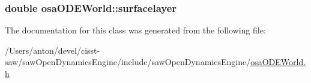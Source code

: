 \subsubsection[{surfacelayer}]{\setlength{\rightskip}{0pt plus 5cm}double osa\+O\+D\+E\+World\+::surfacelayer\hspace{0.3cm}{\ttfamily [protected]}}\label{classosa_o_d_e_world_a36fb96aa0db1cb3a9d38f7183be41389}


The documentation for this class was generated from the following file\+:\begin{DoxyCompactItemize}
\item 
/\+Users/anton/devel/cisst-\/saw/saw\+Open\+Dynamics\+Engine/include/saw\+Open\+Dynamics\+Engine/\hyperlink{osa_o_d_e_world_8h}{osa\+O\+D\+E\+World.\+h}\end{DoxyCompactItemize}

